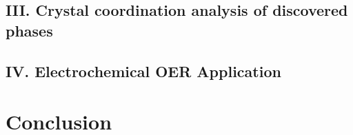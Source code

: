 \documentclass[%
  journal=jacsat,
  manuscript=article,
  ]{achemso}
\begin{document}
  \subsection{III. Crystal coordination analysis of discovered phases}
  

  \subsection{IV. Electrochemical OER Application}
  

\section{Conclusion}


\begin{acknowledgement}

\end{acknowledgement}



\clearpage
\renewcommand{\thefigure}{S\arabic{figure}}
\setcounter{figure}{0}
\renewcommand{\thetable}{S\arabic{table}}
\setcounter{table}{0}

\begin{suppinfo}

\end{suppinfo}


\end{document}
